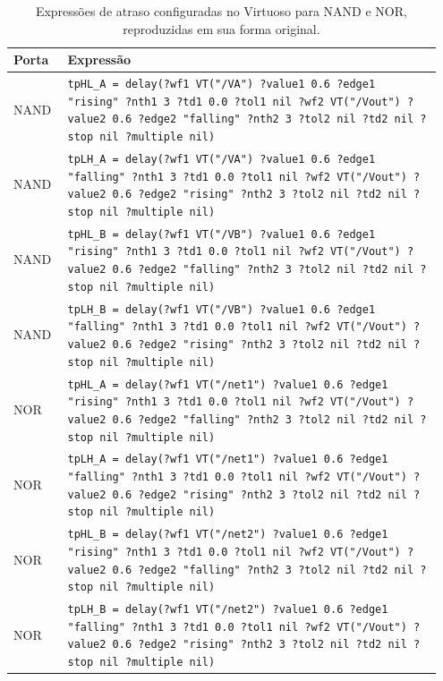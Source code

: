 \documentclass[a4paper]{article}
\begin{document}
\begin{table}[!htbp]
    \centering
    \small
    \caption{Expressões de atraso configuradas no Virtuoso para NAND e NOR, reproduzidas em sua forma original.}
    \label{tab:skew-expressoes}
    \begin{tabular}{@{}p{0.12\linewidth}p{0.83\linewidth}@{}}
        \hline
        Porta & Expressão \\
        \hline
        NAND & \texttt{tpHL\_A = delay(?wf1 VT("/VA") ?value1 0.6 ?edge1 "rising" ?nth1 3 ?td1 0.0 ?tol1 nil ?wf2 VT("/Vout") ?value2 0.6 ?edge2 "falling" ?nth2 3 ?tol2 nil ?td2 nil ?stop nil ?multiple nil)} \\
        NAND & \texttt{tpLH\_A = delay(?wf1 VT("/VA") ?value1 0.6 ?edge1 "falling" ?nth1 3 ?td1 0.0 ?tol1 nil ?wf2 VT("/Vout") ?value2 0.6 ?edge2 "rising" ?nth2 3 ?tol2 nil ?td2 nil ?stop nil ?multiple nil)} \\
        NAND & \texttt{tpHL\_B = delay(?wf1 VT("/VB") ?value1 0.6 ?edge1 "rising" ?nth1 3 ?td1 0.0 ?tol1 nil ?wf2 VT("/Vout") ?value2 0.6 ?edge2 "falling" ?nth2 3 ?tol2 nil ?td2 nil ?stop nil ?multiple nil)} \\
        NAND & \texttt{tpLH\_B = delay(?wf1 VT("/VB") ?value1 0.6 ?edge1 "falling" ?nth1 3 ?td1 0.0 ?tol1 nil ?wf2 VT("/Vout") ?value2 0.6 ?edge2 "rising" ?nth2 3 ?tol2 nil ?td2 nil ?stop nil ?multiple nil)} \\
        NOR & \texttt{tpHL\_A = delay(?wf1 VT("/net1") ?value1 0.6 ?edge1 "rising" ?nth1 3 ?td1 0.0 ?tol1 nil ?wf2 VT("/Vout") ?value2 0.6 ?edge2 "falling" ?nth2 3 ?tol2 nil ?td2 nil ?stop nil ?multiple nil)} \\
        NOR & \texttt{tpLH\_A = delay(?wf1 VT("/net1") ?value1 0.6 ?edge1 "falling" ?nth1 3 ?td1 0.0 ?tol1 nil ?wf2 VT("/Vout") ?value2 0.6 ?edge2 "rising" ?nth2 3 ?tol2 nil ?td2 nil ?stop nil ?multiple nil)} \\
        NOR & \texttt{tpHL\_B = delay(?wf1 VT("/net2") ?value1 0.6 ?edge1 "rising" ?nth1 3 ?td1 0.0 ?tol1 nil ?wf2 VT("/Vout") ?value2 0.6 ?edge2 "falling" ?nth2 3 ?tol2 nil ?td2 nil ?stop nil ?multiple nil)} \\
        NOR & \texttt{tpLH\_B = delay(?wf1 VT("/net2") ?value1 0.6 ?edge1 "falling" ?nth1 3 ?td1 0.0 ?tol1 nil ?wf2 VT("/Vout") ?value2 0.6 ?edge2 "rising" ?nth2 3 ?tol2 nil ?td2 nil ?stop nil ?multiple nil)} \\
        \hline
\end{tabular}
\end{table}
\end{document}

